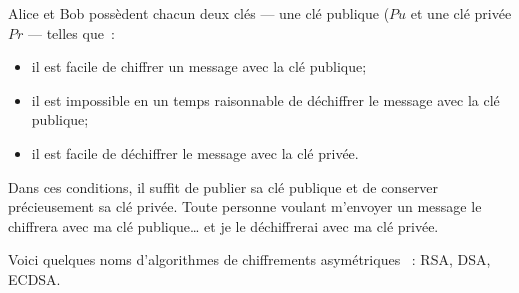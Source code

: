 \documentclass[a4paper,11pt]{article}
\begin{document}
\begin{center}
\end{center}

\vspace{2cm}


Alice et Bob possèdent chacun deux clés — une clé publique ($Pu$ et une clé 
privée $Pr$ — telles que~:

\begin{itemize}
	\item il est facile de chiffrer un message avec la clé publique;

	\item il est impossible en un temps raisonnable de déchiffrer le
		message avec la clé publique;

	\item il est facile de déchiffrer le message avec la clé privée.
\end{itemize}

Dans ces conditions, il suffit de publier sa clé publique et de conserver
précieusement sa clé privée. Toute personne voulant m'envoyer un message le
chiffrera avec ma clé publique… et je le déchiffrerai avec ma clé privée. 


Voici quelques noms d'algorithmes de chiffrements asymétriques
~: RSA, DSA, ECDSA. 
	
\end{document}
